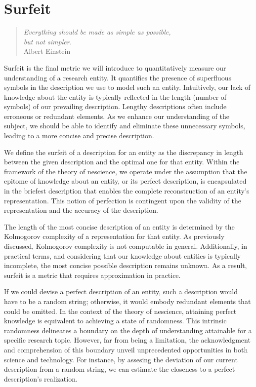 %
%


\chapter{Surfeit}
\label{chap:Redundancy}

\begin{quote}
\begin{flushright}
\emph{Everything should be made as simple as possible,\\
but not simpler.}\\
Albert Einstein 
\end{flushright}
\end{quote}
\bigskip

Surfeit is the final metric we will introduce to quantitatively measure our understanding of a research entity. It quantifies the presence of superfluous symbols in the description we use to model such an entity. Intuitively, our lack of knowledge about the entity is typically reflected in the length (number of symbols) of our prevailing description. Lengthy descriptions often include erroneous or redundant elements. As we enhance our understanding of the subject, we should be able to identify and eliminate these unnecessary symbols, leading to a more concise and precise description.

We define the surfeit of a description for an entity as the discrepancy in length between the given description and the optimal one for that entity. Within the framework of the theory of nescience, we operate under the assumption that the epitome of knowledge about an entity, or its perfect description, is encapsulated in the briefest description that enables the complete reconstruction of an entity’s representation. This notion of perfection is contingent upon the validity of the representation and the accuracy of the description.

The length of the most concise description of an entity is determined by the Kolmogorov complexity of a representation for that entity. As previously discussed, Kolmogorov complexity is not computable in general. Additionally, in practical terms, and considering that our knowledge about entities is typically incomplete, the most concise possible description remains unknown. As a result, surfeit is a metric that requires approximation in practice.

If we could devise a perfect description of an entity, such a description would have to be a random string; otherwise, it would embody redundant elements that could be omitted. In the context of the theory of nescience, attaining perfect knowledge is equivalent to achieving a state of randomness. This intrinsic randomness delineates a boundary on the depth of understanding attainable for a specific research topic. However, far from being a limitation, the acknowledgment and comprehension of this boundary unveil unprecedented opportunities in both science and technology. For instance, by assesing the deviation of our current description from a random string, we can estimate the closeness to a perfect description’s realization.

